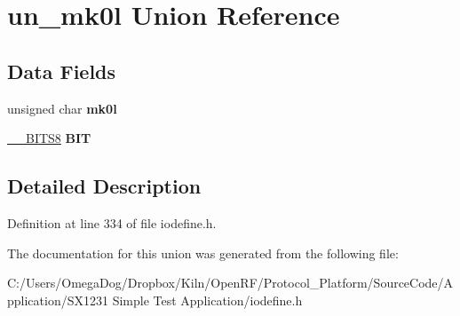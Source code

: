 \hypertarget{unionun__mk0l}{\section{un\-\_\-mk0l Union Reference}
\label{unionun__mk0l}
}
\subsection*{Data Fields}
\begin{DoxyCompactItemize}
\item 
\hypertarget{unionun__mk0l_a9d9755443d0e368509414823c13d90e0}{unsigned char {\bfseries mk0l}}\label{unionun__mk0l_a9d9755443d0e368509414823c13d90e0}

\item 
\hypertarget{unionun__mk0l_a2bcdf1ffbcb92ab564d2828b566e9648}{\hyperlink{struct_____b_i_t_s8}{\-\_\-\-\_\-\-B\-I\-T\-S8} {\bfseries B\-I\-T}}\label{unionun__mk0l_a2bcdf1ffbcb92ab564d2828b566e9648}

\end{DoxyCompactItemize}


\subsection{Detailed Description}


Definition at line 334 of file iodefine.\-h.



The documentation for this union was generated from the following file\-:\begin{DoxyCompactItemize}
\item 
C\-:/\-Users/\-Omega\-Dog/\-Dropbox/\-Kiln/\-Open\-R\-F/\-Protocol\-\_\-\-Platform/\-Source\-Code/\-Application/\-S\-X1231 Simple Test Application/iodefine.\-h\end{DoxyCompactItemize}
